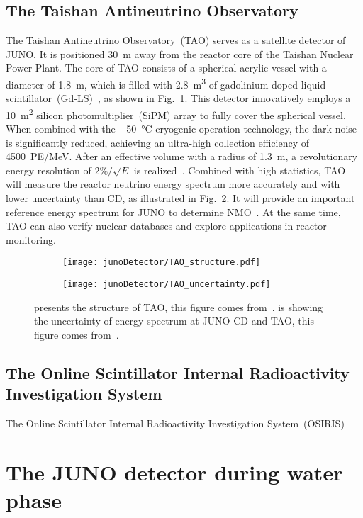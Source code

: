\subsection{The Taishan Antineutrino Observatory}
The Taishan Antineutrino Observatory~(TAO) serves as a satellite detector of JUNO. It is positioned \SI{30}{m} away from the reactor core of the Taishan Nuclear Power Plant. The core of TAO consists of a spherical acrylic vessel with a diameter of \SI{1.8}{m}, which is filled with \SI{2.8}{m^3} of gadolinium-doped liquid scintillator~(Gd-LS)~\cite{TAO_wangzhimin}, as shown in Fig.~\ref{fig:tau_structure}. This detector innovatively employs a \SI{10}{m^2} silicon photomultiplier~(SiPM) array to fully cover the spherical vessel. When combined with the \SI{-50}{\degreeCelsius} cryogenic operation technology, the dark noise is significantly reduced, achieving an ultra-high collection efficiency of \SI{4500}{PE/MeV}. After an effective volume with a radius of \SI{1.3}{m}, a revolutionary energy resolution of $2\%/\sqrt{E}$ is realized~\cite{TAO_wangzhimin}. Combined with high statistics, TAO will measure the reactor neutrino energy spectrum more accurately and with lower uncertainty than CD, as illustrated in Fig.~\ref{fig:tau_uncertainty}. It will provide an important reference energy spectrum for JUNO to determine NMO~\cite{Tao_design}. At the same time, TAO can also verify nuclear databases and explore applications in reactor monitoring.
\begin{figure}[htbp]
	\centering
	\begin{subfigure}{0.5\textwidth}
		\centering
		\texttt{[image: junoDetector/TAO\_structure.pdf]}
		\caption{}
		\label{fig:tau_structure}
	\end{subfigure}%
	\hfill
	\begin{subfigure}{0.5\textwidth}
		\centering
		\texttt{[image: junoDetector/TAO\_uncertainty.pdf]}
		\caption{}
		\label{fig:tau_uncertainty}
	\end{subfigure}
	\caption{ presents the structure of TAO, this figure comes from~\cite{TAO_calib}.  is showing the uncertainty of energy spectrum at JUNO CD and TAO, this figure comes from~\cite{Tao_design}.}
	\label{fig:juno_tao}
\end{figure}
\subsection{The Online Scintillator Internal Radioactivity Investigation System}
The Online Scintillator Internal Radioactivity Investigation System~(OSIRIS)
\section{The JUNO detector during water phase}
\label{sec:juno_water}